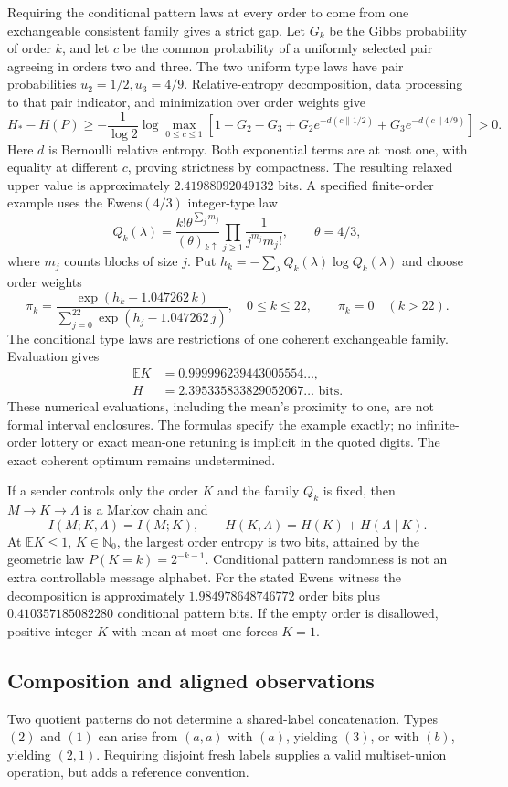Requiring the conditional pattern laws at every order to come from one exchangeable consistent family gives a strict gap. Let $G_k$ be the Gibbs probability of order $k$, and let $c$ be the common probability of a uniformly selected pair agreeing in orders two and three. The two uniform type laws have pair probabilities $u_2=1/2,u_3=4/9$. Relative-entropy decomposition, data processing to that pair indicator, and minimization over order weights give
\[
 H_*-H(P)\ge-\frac1{\log2}\log\max_{0\le c\le1}
 \left[1-G_2-G_3+G_2e^{-d(c\|1/2)}+G_3e^{-d(c\|4/9)}\right]>0.
\]
Here $d$ is Bernoulli relative entropy. Both exponential terms are at most one, with equality at different $c$, proving strictness by compactness. The resulting relaxed upper value is approximately $2.41988092049132$ bits. A specified finite-order example uses the Ewens$(4/3)$ integer-type law
\[
 Q_k(\lambda)=\frac{k!\theta^{\sum_jm_j}}{(\theta)_{k\uparrow}}\prod_{j\ge1}\frac1{j^{m_j}m_j!},\qquad\theta=4/3,
\]
where $m_j$ counts blocks of size $j$. Put $h_k=-\sum_\lambda Q_k(\lambda)\log Q_k(\lambda)$ and choose order weights
\[
 \pi_k=\frac{\exp(h_k-1.047262\,k)}{\sum_{j=0}^{22}\exp(h_j-1.047262\,j)},\quad0\le k\le22,
 \qquad\pi_k=0\quad(k>22).
\]
The conditional type laws are restrictions of one coherent exchangeable family. Evaluation gives
\begin{align*}
\mathbb E K&=0.999996239443005554\ldots,\\
H&=2.395335833829052067\ldots\text{ bits}.
\end{align*} These numerical evaluations, including the mean's proximity to one, are not formal interval enclosures. The formulas specify the example exactly; no infinite-order lottery or exact mean-one retuning is implicit in the quoted digits. The exact coherent optimum remains undetermined.

If a sender controls only the order $K$ and the family $Q_k$ is fixed, then $M\to K\to\Lambda$ is a Markov chain and
\[
 I(M;K,\Lambda)=I(M;K),\qquad
 H(K,\Lambda)=H(K)+H(\Lambda\mid K).
\]
At $\mathbb EK\le1$, $K\in\mathbb N_0$, the largest order entropy is two bits, attained by the geometric law $P(K=k)=2^{-k-1}$. Conditional pattern randomness is not an extra controllable message alphabet. For the stated Ewens witness the decomposition is approximately $1.984978648746772$ order bits plus $0.410357185082280$ conditional pattern bits. If the empty order is disallowed, positive integer $K$ with mean at most one forces $K=1$.

\subsection{Composition and aligned observations}
\label{pat:composition}
Two quotient patterns do not determine a shared-label concatenation. Types $(2)$ and $(1)$ can arise from $(a,a)$ with $(a)$, yielding $(3)$, or with $(b)$, yielding $(2,1)$. Requiring disjoint fresh labels supplies a valid multiset-union operation, but adds a reference convention.

